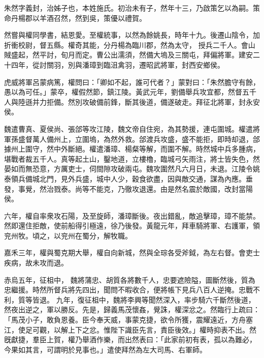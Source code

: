 \begin{pinyinscope}
 
 
 
 
 朱然字義封，治姊子也，本姓施氏。初治未有子，然年十三，乃啟策乞以為嗣。策命丹楊郡以羊酒召然，然到吳，策優以禮賀。
 
 
然嘗與權同學書，結恩愛。至權統事，以然為餘姚長，時年十九。後遷山陰令，加折衝校尉，督五縣。權奇其能，分丹楊為臨川郡，然為太守，
 授兵二千人。會山賊盛起，然平討，旬月而定。曹公出濡須，然備大塢及三關屯，拜偏將軍。建安二十四年，從討關羽，別與潘璋到臨沮禽羽，遷昭武將軍，封西安鄉侯。
 
 
 
 
 虎威將軍呂蒙病篤，權問曰：「卿如不起，誰可代者？」蒙對曰：「朱然膽守有餘，愚以為可任。」蒙卒，權假然節，鎮江陵。黃武元年，劉備舉兵攻宜都，然督五千人與陸遜并力拒備。然別攻破備前鋒，斷其後道，備遂破走。拜征北將軍，封永安侯。
 
 
 
 
 魏遣曹真、夏侯尚、張郃等攻江陵，魏文帝自住宛，為其勢援，連屯圍城。權遣將軍孫盛督萬人備州上，立圍塢，為然外救。郃渡兵攻盛，盛不能拒，即時却退，郃據州上圍守，然中外斷絕。權遣潘璋、楊粲等解，而圍不解。時然城中兵多腫病，堪戰者裁五千人。真等起土山，鑿地道，立樓櫓，臨城弓矢雨注，將士皆失色，然晏如而無恐意，方厲吏士，伺間隙攻破兩屯。魏攻圍然凡六月日，未退。江陵令姚泰領兵備城北門，見外兵盛，城中人少，穀食欲盡，因與敵交通，謀為內應。垂發，事覺，然治戮泰。尚等不能克，乃徹攻退還。由是然名震於敵國，改封當陽侯。
 
 
 
 
 六年，權自率衆攻石陽，及至旋師，潘璋斷後。夜出錯亂，敵追擊璋，璋不能禁。然即還住拒敵，使前船得引極遠，徐乃後發。黃龍元年，拜車騎將軍、右護軍，領兖州牧。頃之，以兖州在蜀分，解牧職。
 
 
 
 
 嘉禾三年，權與蜀克期大舉，權自向新城，然與全琮各受斧鉞，為左右督。會吏士疾病，故未攻而退。
 
 
赤烏五年，征柤中，
 魏將蒲忠、胡質各將數千人，忠要遮險隘，圖斷然後，質為忠繼援。時然所督兵將先四出，聞問不暇收合，便將帳下見兵八百人逆掩。忠戰不利，質等皆退。
 九年，復征柤中，魏將李興等聞然深入，率步騎六千斷然後道，然夜出逆之，軍以勝反。先是，歸義馬茂懷姦，覺誅，權深忿之。然臨行上疏曰：「馬茂小子，敢負恩養。臣今奉天威，事蒙克捷，欲令所獲，震耀遠近，方舟塞江，使足可觀，以解上下之忿。惟陛下識臣先言，責臣後效。」權時抑表不出。然旣獻捷，羣臣上賀，權乃舉酒作樂，而出然表曰：「此家前初有表，孤以為難必，今果如其言，可謂明於見事也。」遣使拜然為左大司馬、右軍師。
 

\end{pinyinscope}

